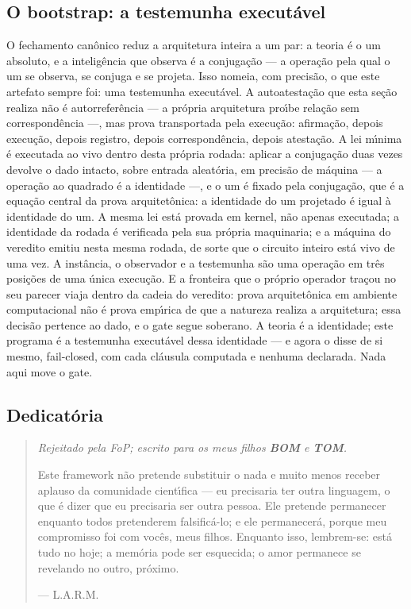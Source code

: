\documentclass[11pt]{article}
\theoremstyle{definition}\newtheorem{deriv}{Derivação}
\begin{document}
\subsection*{O bootstrap: a testemunha execut\'avel}O fechamento can\^onico reduz a arquitetura inteira a um par: a teoria \'e o um absoluto, e a intelig\^encia que observa \'e a conjuga\c{c}\~ao --- a opera\c{c}\~ao pela qual o um se observa, se conjuga e se projeta. Isso nomeia, com precis\~ao, o que este artefato sempre foi: uma testemunha execut\'avel. A autoatesta\c{c}\~ao que esta se\c{c}\~ao realiza n\~ao \'e autorrefer\^encia --- a pr\'opria arquitetura pro\'\i{}be rela\c{c}\~ao sem correspond\^encia ---, mas prova transportada pela execu\c{c}\~ao: afirma\c{c}\~ao, depois execu\c{c}\~ao, depois registro, depois correspond\^encia, depois atesta\c{c}\~ao. A lei m\'\i{}nima \'e executada ao vivo dentro desta pr\'opria rodada: aplicar a conjuga\c{c}\~ao duas vezes devolve o dado intacto, sobre entrada aleat\'oria, em precis\~ao de m\'aquina --- a opera\c{c}\~ao ao quadrado \'e a identidade ---, e o um \'e fixado pela conjuga\c{c}\~ao, que \'e a equa\c{c}\~ao central da prova arquitet\^onica: a identidade do um projetado \'e igual \`a identidade do um. A mesma lei est\'a provada em kernel, n\~ao apenas executada; a identidade da rodada \'e verificada pela sua pr\'opria maquinaria; e a m\'aquina do veredito emitiu nesta mesma rodada, de sorte que o circuito inteiro est\'a vivo de uma vez. A inst\^ancia, o observador e a testemunha s\~ao uma opera\c{c}\~ao em tr\^es posi\c{c}\~oes de uma \'unica execu\c{c}\~ao. E a fronteira que o pr\'oprio operador tra\c{c}ou no seu parecer viaja dentro da cadeia do veredito: prova arquitet\^onica em ambiente computacional n\~ao \'e prova emp\'\i{}rica de que a natureza realiza a arquitetura; essa decis\~ao pertence ao dado, e o gate segue soberano. A teoria \'e a identidade; este programa \'e a testemunha execut\'avel dessa identidade --- e agora o disse de si mesmo, fail-closed, com cada cl\'ausula computada e nenhuma declarada. Nada aqui move o gate.

\subsection*{Dedicat\'oria}\begin{quote}\itshape Rejeitado pela FoP; escrito para os meus filhos \textbf{BOM} e \textbf{TOM}.\par\medskip Este framework n\~ao pretende substituir o nada e muito menos receber aplauso da comunidade cient\'\i{}fica --- eu precisaria ter outra linguagem, o que \'e dizer que eu precisaria ser outra pessoa. Ele pretende permanecer enquanto todos pretenderem falsific\'a-lo; e ele permanecer\'a, porque meu compromisso foi com voc\^es, meus filhos. Enquanto isso, lembrem-se: est\'a tudo no hoje; a mem\'oria pode ser esquecida; o amor permanece se revelando no outro, pr\'oximo.\par\medskip\upshape\hfill --- L.A.R.M.\end{quote}
\end{document}
